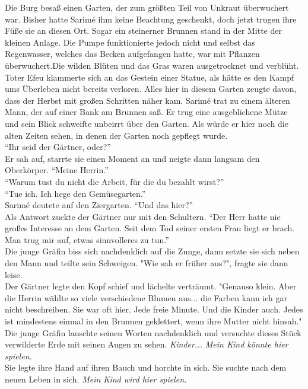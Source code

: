 Die Burg besaß einen Garten, der zum größten Teil von Unkraut überwuchert war. Bisher hatte Sarimé 
ihm keine Beachtung geschenkt, doch jetzt trugen ihre Füße sie an diesen Ort. Sogar ein steinerner 
Brunnen stand in der Mitte der kleinen Anlage. Die Pumpe funktionierte jedoch nicht und selbst das 
Regenwasser, welches das Becken aufgefangen hatte, war mit Pflanzen überwuchert.Die wilden Blüten 
und das Gras waren ausgetrocknet und verblüht. Toter Efeu klammerte sich an das Gestein einer 
Statue, als hätte es den Kampf ums Überleben nicht bereits verloren. Alles hier in diesem Garten 
zeugte davon, dass der Herbst mit großen Schritten näher kam. Sarimé trat zu einem älteren Mann, 
der auf einer Bank am Brunnen saß. Er trug eine ausgeblichene Mütze und sein Blick schweifte 
unbeirrt über den Garten. Als würde er hier noch die alten Zeiten sehen, in denen der Garten noch 
gepflegt wurde.\\
``Ihr seid der Gärtner, oder?''\\
Er sah auf, starrte sie einen Moment an und neigte dann langsam den Oberkörper. ``Meine Herrin.''\\
``Warum tust du nicht die Arbeit, für die du bezahlt wirst?''\\
``Tue ich. Ich hege den Gemüsegarten.''\\
Sarimé deutete auf den Ziergarten. ``Und das hier?''\\
Als Antwort zuckte der Gärtner nur mit den Schultern. ``Der Herr hatte nie großes Interesse an dem 
Garten. Seit dem Tod seiner ersten Frau liegt er brach. Man trug mir auf, etwas sinnvolleres zu 
tun.''\\
Die junge Gräfin biss sich nachdenklich auf die Zunge, dann setzte sie sich neben den Mann und 
teilte sein Schweigen. "Wie sah er früher aus?", fragte sie dann leise.\\
Der Gärtner legte den Kopf schief und lächelte verträumt. "Genauso klein. Aber die Herrin wählte so 
viele verschiedene Blumen aus... die Farben kann ich gar nicht beschreiben. Sie war oft hier. Jede 
freie Minute. Und die Kinder auch. Jedes ist mindestens einmal in den Brunnen geklettert, wenn ihre 
Mutter nicht hinsah."\\
Die junge Gräfin lauschte seinen Worten nachdenklich und versuchte dieses Stück verwilderte Erde 
mit 
seinen Augen zu sehen. \textit{Kinder... Mein Kind könnte hier spielen.}\\
Sie legte ihre Hand auf ihren Bauch und horchte in sich. Sie suchte nach dem neuen Leben in 
sich. \textit{Mein Kind wird hier spielen.}\\
